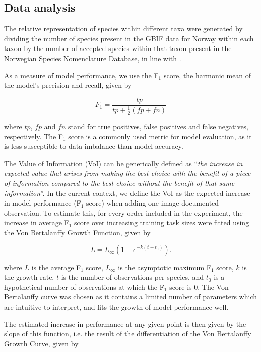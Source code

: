 \documentclass{article}
\begin{document}
\subsection*{Data analysis}
The relative representation of species within different taxa were generated by dividing the number of species present in the GBIF data for Norway within each taxon by the number of accepted species within that taxon present in the Norwegian Species Nomenclature Database\autocite{Artsnavnebase}, in line with \citeauthor{Troudet2017}\autocite{Troudet2017}. 

As a measure of model performance, we use the F\(_1\) score, the harmonic mean of the model's precision and recall, given by 

\[ F_1 = \frac{tp}{tp + \frac{1}{2}(fp + fn)} \]


where \(tp\), \(fp\) and \(fn\) stand for true positives, false positives and false negatives, respectively. The F\(_1\) score is a commonly used metric for model evaluation, as it is less susceptible to data imbalance than model accuracy\autocite{Goodfellow-et-al-2016}. 

The Value of Information (VoI) can be generically defined as ``\textit{the increase in expected value that arises from making the best choice with the benefit of a piece of information compared to the best choice without the benefit of that same information}''\autocite{Keisler2013}. In the current context, we define the VoI as the expected increase in model performance (F\(_1\) score) when adding one image-documented observation. To estimate this, for every order included in the experiment, the increase in average F\(_1\) score over increasing training task sizes were fitted using the Von Bertalanffy Growth Function, given by 

\[ L = L_\infty(1 - e^{-k(t-t_0)}). \]

where \(L\) is the average F\(_1\) score, \(L_\infty\) is the asymptotic maximum F\(_1\) score, \(k\) is the growth rate, \(t\) is the number of observations per species, and \(t_0\) is a hypothetical number of observations at which the F\(_1\) score is 0. The Von Bertalanffy curve was chosen as it contains a limited number of parameters which are intuitive to interpret, and fits the growth of model performance well.

The estimated increase in performance at any given point is then given by the slope of this function, i.e. the result of the differentiation of the Von Bertalanffy Growth Curve, given\autocite{Campbell1972} by
\end{document}
